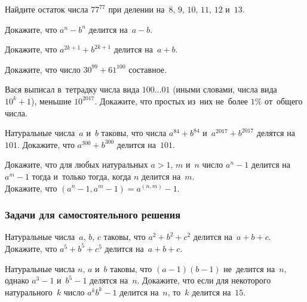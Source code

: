 


\begin{problems}

\item
Найдите остаток числа $77^{77}$ при делении на~$8$, $9$, $10$, $11$, $12$
и~$13$.

\item
Докажите, что $a^{n} - b^{n}$ делится на~$a - b$. 

\item
Докажите, что $a^{2k+1} + b^{2k+1}$ делится на~$a + b$.

\item
Докажите, что число $30^{99} + 61^{100}$ составное.

\item
Вася выписал в~тетрадку числа вида $100{\ldots}01$ (иными словами, числа вида
$10^k+1$), меньшие $10^{2017}$.
Докажите, что простых из~них не~более $1\%$ от~общего числа.

\item
Натуральные числа~$a$ и~$b$ таковы, что числа $a^{84} + b^{84}$
и~$a^{2017} + b^{2017}$ делятся на~$101$.
Докажите, что $a^{300} + b^{300}$ делится на~$101$.

\item
\subproblem
Докажите, что для любых натуральных $a > 1$, $m$ и~$n$ число $a^{n} - 1$
делится на~$a^{m} - 1$ тогда и~только тогда, когда $n$ делится на~$m$.
\\
\subproblem
Докажите, что $(a^{n} - 1, a^{m} - 1) = a^{(n,m)}-1$.

\end{problems}

\subsubsection*{Задачи для самостоятельного решения}

\begin{problems}

\item
Натуральные числа~$a$, $b$, $c$ таковы, что $a^2 + b^2 + c^2$ делится
на~$a + b + c$.
Докажите, что $a^5 + b^5 + c^5$ делится на~$a + b + c$.

\item
Натуральные числа $n$, $a$ и~$b$ таковы, что $(a - 1) (b - 1)$ не~делится
на~$n$, однако $a^{3} - 1$ и~$b^{5} - 1$ делятся на~$n$.
Докажите, что если для некоторого натурального~$k$ число $a^{k} b^{k} - 1$
делится на~$n$, то~$k$ делится на~$15$.

\end{problems}

